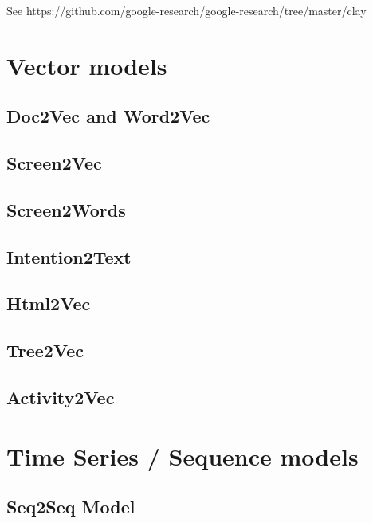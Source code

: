 See \cite{clay}
https://github.com/google-research/google-research/tree/master/clay


\section{Vector models}

\subsection{Doc2Vec and Word2Vec}

\subsection{Screen2Vec}

\subsection{Screen2Words}

\subsection{Intention2Text}

\subsection{Html2Vec}

\subsection{Tree2Vec}

\subsection{Activity2Vec}

\section{Time Series / Sequence models}
\subsection{Seq2Seq Model}


